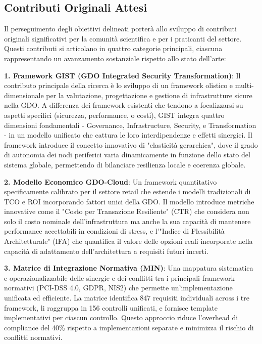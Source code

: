 \subsection{Contributi Originali Attesi}

Il perseguimento degli obiettivi delineati porterà allo sviluppo di contributi originali significativi per la comunità scientifica e per i praticanti del settore. Questi contributi si articolano in quattro categorie principali, ciascuna rappresentando un avanzamento sostanziale rispetto allo stato dell'arte:

\textbf{1. Framework GIST (GDO Integrated Security Transformation)}: Il contributo principale della ricerca è lo sviluppo di un framework olistico e multi-dimensionale per la valutazione, progettazione e gestione di infrastrutture sicure nella GDO. A differenza dei framework esistenti che tendono a focalizzarsi su aspetti specifici (sicurezza, performance, o costi), GIST integra quattro dimensioni fondamentali - Governance, Infrastructure, Security, e Transformation - in un modello unificato che cattura le loro interdipendenze e effetti sinergici. Il framework introduce il concetto innovativo di "elasticità gerarchica", dove il grado di autonomia dei nodi periferici varia dinamicamente in funzione dello stato del sistema globale, permettendo di bilanciare resilienza locale e coerenza globale.

\textbf{2. Modello Economico GDO-Cloud}: Un framework quantitativo specificamente calibrato per il settore retail che estende i modelli tradizionali di TCO e ROI incorporando fattori unici della GDO. Il modello introduce metriche innovative come il "Costo per Transazione Resiliente" (CTR) che considera non solo il costo nominale dell'infrastruttura ma anche la sua capacità di mantenere performance accettabili in condizioni di stress, e l'"Indice di Flessibilità Architetturale" (IFA) che quantifica il valore delle opzioni reali incorporate nella capacità di adattamento dell'architettura a requisiti futuri incerti.

\textbf{3. Matrice di Integrazione Normativa (MIN)}: Una mappatura sistematica e operazionalizzabile delle sinergie e dei conflitti tra i principali framework normativi (PCI-DSS 4.0, GDPR, NIS2) che permette un'implementazione unificata ed efficiente. La matrice identifica 847 requisiti individuali across i tre framework, li raggruppa in 156 controlli unificati, e fornisce template implementativi per ciascun controllo. Questo approccio riduce l'overhead di compliance del 40\% rispetto a implementazioni separate e minimizza il rischio di conflitti normativi.

